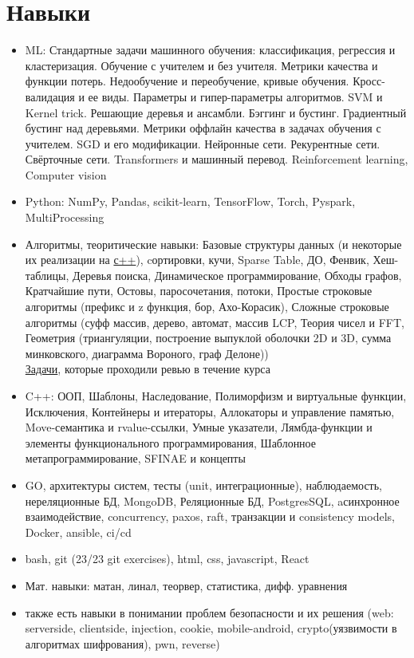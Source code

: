 \documentclass[a4paper,10pt]{article}
\begin{document}
\section*{Навыки}
\noindent
\begin{itemize}[noitemsep]
    \item ML: Стандартные задачи машинного обучения: классификация, регрессия и кластеризация. Обучение с учителем и без учителя. Метрики качества и функции потерь. Недообучение и переобучение, кривые обучения. Кросс-валидация и ее виды. Параметры и гипер-параметры алгоритмов.
    SVM и Kernel trick.
    Решающие деревья и ансамбли.
    Бэггинг и бустинг.
    Градиентный бустинг над деревьями.
    Метрики оффлайн качества в задачах обучения с учителем.
    SGD и его модификации.
    Нейронные сети.
    Рекурентные сети.
    Свёрточные сети.
    Transformers и машинный перевод.
    Reinforcement learning, Computer vision
    \item Python: NumPy, Pandas, scikit-learn, TensorFlow, Torch, Pyspark, MultiProcessing
    \item Алгоритмы, теоритические навыки: Базовые структуры данных (и некоторые их реализации на \href{https://github.com/grgtr/MIPT-CPP}{с++}), cортировки, кучи, Sparse Table, ДО, Фенвик, Хеш-таблицы, Деревья поиска, Динамическое программирование, Обходы графов, Кратчайшие пути, Остовы, паросочетания, потоки, Простые строковые алгоритмы (префикс и z функция, бор, Ахо-Корасик), Сложные строковые алгоритмы (суфф массив, дерево, автомат, массив LCP, Теория чисел и FFT, Геометрия (триангуляции, построение выпуклой оболочки 2D и 3D, сумма минковского, диаграмма Вороного, граф Делоне)) \\
    \href{https://gitlab.com/grgtr}{Задачи}, которые проходили ревью в течение курса
    \item C++: ООП, Шаблоны, Наследование, Полиморфизм и виртуальные функции, Исключения, Контейнеры и итераторы, Аллокаторы и управление памятью, Move-семантика и rvalue-ссылки, Умные указатели, Лямбда-функции и элементы функционального программирования, Шаблонное метапрограммирование, SFINAE и концепты

    \item GO, архитектуры систем, тесты (unit, интеграционные), наблюдаемость, нереляционные БД, MongoDB, Реляционные БД, PostgresSQL, aсинхронное взаимодействие, concurrency, paxos, raft, транзакции и consistency models, Docker, ansible, ci/cd

    \item bash, git (23/23 git exercises), html, css, javascript, React
    \item Мат. навыки: матан, линал, теорвер, статистика, дифф. уравнения
    \item также есть навыки в понимании проблем безопасности и их решения (web: serverside, clientside, injection, cookie, mobile-android, crypto(уязвимости в алгоритмах шифрования), pwn, reverse)
\end{itemize}
\end{document}
